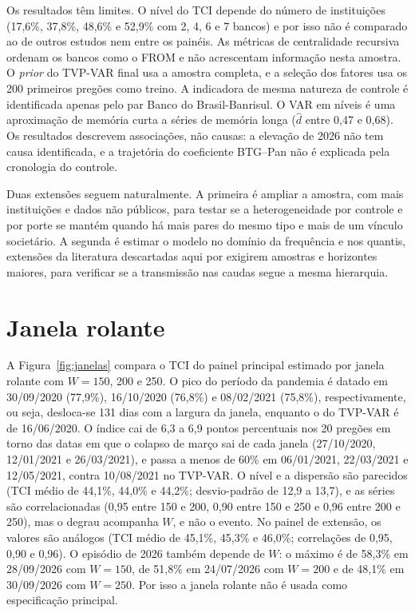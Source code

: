 Os resultados têm limites. O nível do TCI depende do número de instituições (17,6\%,
37,8\%, 48,6\% e 52,9\% com 2, 4, 6 e 7 bancos) e por isso não é comparado ao de outros
estudos nem entre os painéis. As métricas de centralidade recursiva ordenam os bancos
como o FROM e não acrescentam informação nesta amostra. O \textit{prior} do TVP-VAR
final usa a amostra completa, e a seleção dos fatores usa os 200 primeiros pregões
como treino. A indicadora de mesma
natureza de controle é identificada apenas pelo par Banco do Brasil-Banrisul. O VAR
em níveis é uma aproximação de memória curta a séries de memória longa ($\hat{d}$
entre 0,47 e 0,68). Os resultados descrevem associações, não causas: a elevação de 2026 não tem
causa identificada, e a trajetória do coeficiente BTG--Pan não é explicada pela
cronologia do controle.

Duas extensões seguem naturalmente. A primeira é ampliar a amostra, com mais
instituições e dados não públicos, para testar se a heterogeneidade por controle e
por porte se mantém quando há mais pares do mesmo tipo e mais de um vínculo
societário. A segunda é estimar o modelo no domínio da frequência e nos quantis,
extensões da literatura descartadas aqui por exigirem amostras e horizontes maiores,
para verificar se a transmissão nas caudas segue a mesma hierarquia.


\appendix

\chapter{Janela rolante}
\label{ap:janela}

A Figura~\ref{fig:janelas} compara o TCI do painel principal estimado por janela
rolante com $W=150$, 200 e 250. O pico do período da pandemia é datado em
30/09/2020 (77,9\%), 16/10/2020 (76,8\%) e 08/02/2021 (75,8\%), respectivamente, ou
seja, desloca-se 131 dias com a largura da janela, enquanto o do TVP-VAR é de
16/06/2020. O índice cai de 6,3 a 6,9 pontos percentuais nos 20 pregões em torno
das datas em que o colapso de março sai de cada janela (27/10/2020, 12/01/2021 e
26/03/2021), e passa a menos de 60\% em 06/01/2021, 22/03/2021 e 12/05/2021, contra
10/08/2021 no TVP-VAR. O nível e a dispersão são parecidos (TCI médio de 44,1\%,
44,0\% e 44,2\%; desvio-padrão de 12,9 a 13,7), e as séries são correlacionadas
(0,95 entre 150 e 200, 0,90 entre 150 e 250 e 0,96 entre 200 e 250), mas o degrau
acompanha $W$, e não o evento. No painel de extensão, os valores são análogos (TCI
médio de 45,1\%, 45,3\% e 46,0\%; correlações de 0,95, 0,90 e 0,96). O episódio de
2026 também depende de $W$: o máximo é de 58,3\% em 28/09/2026 com $W=150$, de 51,8\%
em 24/07/2026 com $W=200$ e de 48,1\% em 30/09/2026 com $W=250$. Por isso a janela
rolante não é usada como especificação principal.


